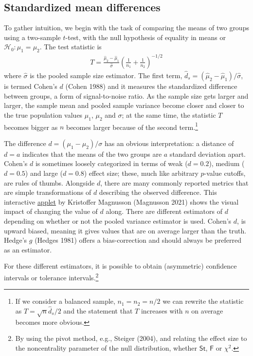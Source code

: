 \documentclass[
  11pt,
  letterpaper,
]{scrbook}
\theoremstyle{definition}
\theoremstyle{definition}
\theoremstyle{remark}
\begin{document}
\subsection{Standardized mean
differences}\label{standardized-mean-differences}

To gather intuition, we begin with the task of comparing the means of
two groups using a two-sample \(t\)-test, with the null hypothesis of
equality in means or \(\mathscr{H}_0: \mu_1 = \mu_2\). The test
statistic is \begin{align*}
T =  \frac{\widehat{\mu}_2 - \widehat{\mu}_1}{\widehat{\sigma}} \left(\frac{1}{n_1}+\frac{1}{n_2}\right)^{-1/2}
\end{align*} where \(\widehat{\sigma}\) is the pooled sample size
estimator. The first term,
\(\widehat{d}_s = (\widehat{\mu}_2 - \widehat{\mu}_1)/\widehat{\sigma}\),
is termed Cohen's \(d\) (Cohen 1988) and it measures the standardized
difference between groups, a form of signal-to-noise ratio. As the
sample size gets larger and larger, the sample mean and pooled sample
variance become closer and closer to the true population values
\(\mu_1\), \(\mu_2\) and \(\sigma\); at the same time, the statistic
\(T\) becomes bigger as \(n\) becomes larger because of the second
term.\footnote{If we consider a balanced sample, \(n_1 = n_2 = n/2\) we
  can rewrite the statistic as \(T = \sqrt{n} \widehat{d}_s/2\) and the
  statement that \(T\) increases with \(n\) on average becomes more
  obvious.}

The difference \(d=(\mu_1-\mu_2)/\sigma\) has an obvious interpretation:
a distance of \(d=a\) indicates that the means of the two groups are
\(a\) standard deviation apart. Cohen's \(d\) is sometimes loosely
categorized in terms of weak (\(d = 0.2\)), medium (\(d=0.5\)) and large
(\(d=0.8\)) effect size; these, much like arbitrary \(p\)-value cutoffs,
are rules of thumbs. Alongside \(d\), there are many commonly reported
metrics that are simple transformations of \(d\) describing the observed
difference. This interactive
\href{https://rpsychologist.com/cohend/}{applet} by Kristoffer Magnusson
(Magnusson 2021) shows the visual impact of changing the value of \(d\)
along. There are different estimators of \(d\) depending on whether or
not the pooled variance estimator is used. Cohen's \(d\), is upward
biased, meaning it gives values that are on average larger than the
truth. Hedge's \(g\) (Hedges 1981) offers a bias-correction and should
always be preferred as an estimator.

For these different estimators, it is possible to obtain (asymmetric)
confidence intervals or tolerance intervals.\footnote{By using the pivot
  method, e.g., Steiger (2004), and relating the effect size to the
  noncentrality parameter of the null distribution, whether
  \(\mathsf{St}\), \(\mathsf{F}\) or \(\chi^2\).}
\end{document}
